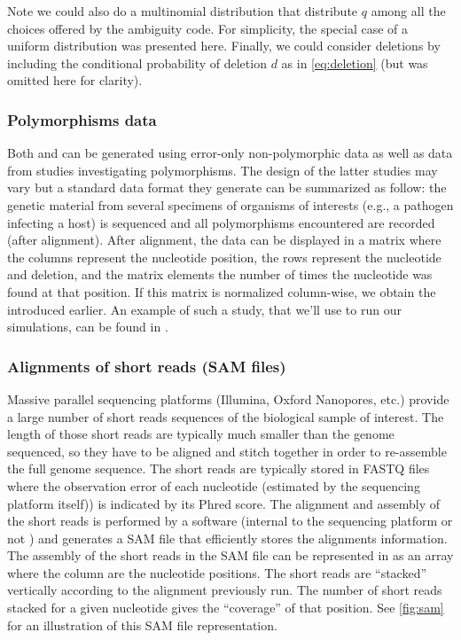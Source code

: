 \documentclass[10pt]{article}
\begin{document}
Note we could also do a multinomial distribution that distribute $q$ among all the choices offered by the ambiguity code. For simplicity, the special case of a uniform distribution was presented here. Finally, we could consider deletions by including the conditional probability of deletion $d$ as in \autoref{eq:deletion} (but was omitted here for clarity). 


\subsubsection{Polymorphisms data}
Both \nlps and \slps can be generated using error-only non-polymorphic data as well as data from studies investigating polymorphisms.
The design of the latter studies may vary but a standard data format they generate can be summarized as follow: the genetic material from several specimens of organisms of interests (e.g., a pathogen infecting a host) is sequenced and all polymorphisms encountered are recorded (after alignment). 
After alignment, the data can be displayed in a matrix where the columns represent the nucleotide position, the rows represent the nucleotide and deletion, and the matrix elements the number of times the nucleotide was found at that position.
If this matrix is normalized column-wise, we obtain the \slps introduced earlier. 
An example of such a study, that we'll use to run our simulations, can be found in \cite{Zanini:2015}. 



\subsubsection{Alignments of short reads (SAM files)}

Massive parallel sequencing platforms (\eg Illumina, Oxford Nanopores, etc.) provide a large number of short reads sequences of the biological sample of interest. The length of those short reads are typically much smaller than the genome sequenced, so they have to be aligned and stitch together in order to re-assemble the full genome sequence.
The short reads are typically stored in FASTQ files where the observation error of each nucleotide (estimated by the sequencing platform itself)) is indicated by its Phred score. 
The alignment and assembly of the short reads is performed by a software (internal to the sequencing platform or not ) and generates a SAM file  that efficiently stores the alignments information.
The assembly of the short reads in the SAM file can be represented in as an array where the column are the nucleotide positions. The short reads are ``stacked'' vertically according to the alignment previously run. The number of short reads stacked for a given nucleotide gives the ``coverage'' of that position.
See \autoref{fig:sam} for an illustration of this SAM file representation.
\end{document}
